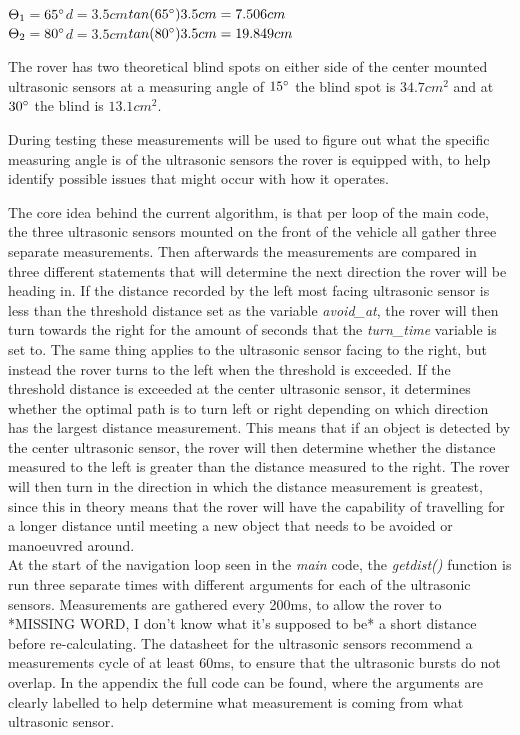 $\Theta_1 = 65\degree$\quad\quad$d = 3.5cm$\quad\quad$tan(65\degree)3.5cm =  7.506cm$\\
$\Theta_2 = 80\degree$\quad\quad$d = 3.5cm$\quad\quad$tan(80\degree)3.5cm =  19.849cm$

The rover has two theoretical blind spots on either side of the center mounted ultrasonic sensors at a measuring angle of $15\degree$ the blind spot is $34.7cm^2$ and at $30\degree$ the blind is $13.1cm^2$. 

During testing these measurements will be used to figure out what the specific measuring angle is of the ultrasonic sensors the rover is equipped with, to help identify possible issues that might occur with how it operates.

\clearpage


The core idea behind the current algorithm, is that per loop of the main code, the three ultrasonic sensors mounted on the front of the vehicle all gather three separate measurements. Then afterwards the measurements are compared in three different statements that will determine the next direction the rover will be heading in. If the distance recorded by the left most facing ultrasonic sensor is less than the threshold distance set as the variable \textit{avoid\_at}, the rover will then turn towards the right for the amount of seconds that the \textit{turn\_time} variable is set to. The same thing applies to the ultrasonic sensor facing to the right, but instead the rover turns to the left when the threshold is exceeded.
If the threshold distance is exceeded at the center ultrasonic sensor, it determines whether the optimal path is to turn left or right depending on which direction has the largest distance measurement. This means that if an object is detected by the center ultrasonic sensor, the rover will then determine whether the distance measured to the left is greater than the distance measured to the right. The rover will then turn in the direction in which the distance measurement is greatest, since this in theory means that the rover will have the capability of travelling for a longer distance until meeting a new object that needs to be avoided or manoeuvred around.\\




At the start of the navigation loop seen in the \textit{main} code, the \textit{getdist()} function is run three separate times with different arguments for each of the ultrasonic sensors. Measurements are gathered every 200ms, to allow the rover to *MISSING WORD, I don't know what it's supposed to be* a short distance before re-calculating. The datasheet for the ultrasonic sensors recommend a measurements cycle of at least 60ms, to ensure that the ultrasonic bursts do not overlap. In the appendix the full code can be found, where the arguments are clearly labelled to help determine what measurement is coming from what ultrasonic sensor.
